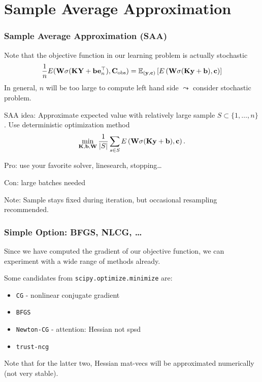\documentclass[12pt,fleqn,handout]{beamer}
\begin{document}
\section{Sample Average Approximation}

\begin{frame}
	\frametitle{Sample Average Approximation (SAA)}
	
	Note that the objective function in our learning problem is actually stochastic
	$$
	\frac{1}{n}E({\bf W} \sigma({\bf K}{\bf Y}+{\bf b}{\bf e}_n^\top),{\bf C}_{\rm obs}) =  {\mathbb{E}}_{({\bf y},{\bf c})}\left[E\left({\bf W} \sigma({\bf K}{\bf y}+{\bf b}),{\bf c}\right)\right]
	$$
	In general, $n$ will be too large to compute left hand side $\leadsto$ consider stochastic problem.
	
	\bigskip
	SAA idea:  Approximate expected value with relatively large sample $S \subset \{ 1,\ldots,n\}$. Use deterministic optimization method  
			$$
				\min_{{\bf K},{\bf b},{\bf W}}  \frac{1}{|S|} \sum_{s\in S} E\left({\bf W} \sigma({\bf K}{\bf y}+{\bf b}),{\bf c}\right).
			$$
		
			Pro: use your favorite solver, linesearch, stopping\ldots
			
			Con: large batches needed
			
			\begin{center}
				Note: Sample stays fixed during iteration, but occasional resampling recommended.
			\end{center}
\end{frame}

\begin{frame}
	\frametitle{Simple Option: BFGS, NLCG, \ldots}
	
	Since we have computed the gradient of our objective function, we can experiment with a wide range of methods already. 
	
	\bigskip
	
	Some candidates from \texttt{scipy.optimize.minimize} are:
	\begin{itemize}
		\item \texttt{CG} - nonlinear conjugate gradient
		\item \texttt{BFGS} 
		\item \texttt{Newton-CG} - attention: Hessian not spsd
		\item \texttt{trust-ncg} 
	\end{itemize}
	Note that for the latter two, Hessian mat-vecs will be approximated numerically (not very stable).
	
\end{frame}
\end{document}
